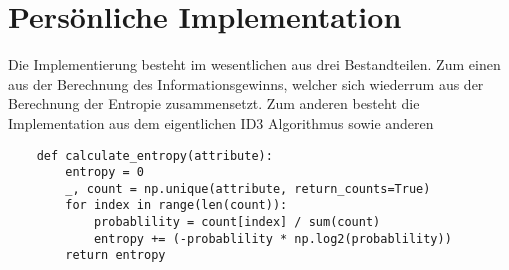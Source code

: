 \section{Persönliche Implementation}
\label{id3:implementation}

Die Implementierung besteht im wesentlichen aus drei Bestandteilen. Zum einen aus der Berechnung des Informationsgewinns, welcher sich wiederrum aus der Berechnung der Entropie zusammensetzt. Zum anderen besteht die Implementation aus dem eigentlichen ID3 Algorithmus sowie anderen




\begin{verbatim}
    def calculate_entropy(attribute):
        entropy = 0
        _, count = np.unique(attribute, return_counts=True)
        for index in range(len(count)):
            probablility = count[index] / sum(count)
            entropy += (-probablility * np.log2(probablility))
        return entropy
\end{verbatim}